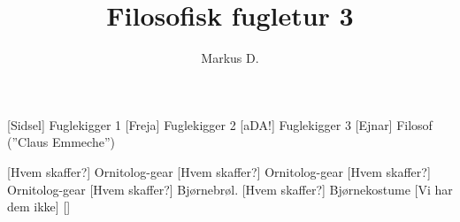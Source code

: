 \documentclass[a4paper,12pt]{article}
\title{Filosofisk fugletur 3}
\author{Markus D.}
\begin{document}
\maketitle




\begin{roles}
	[Sidsel] Fuglekigger 1
	[Freja] Fuglekigger 2
	[aDA!] Fuglekigger 3
	[Ejnar] Filosof (''Claus Emmeche'')
\end{roles}


\begin{props}
	[Hvem skaffer?] Ornitolog-gear
	[Hvem skaffer?] Ornitolog-gear
	[Hvem skaffer?] Ornitolog-gear
	[Hvem skaffer?] Bjørnebrøl.
	[Hvem skaffer?] Bjørnekostume
	 [Vi har dem ikke]
\end{props}
\end{document}
